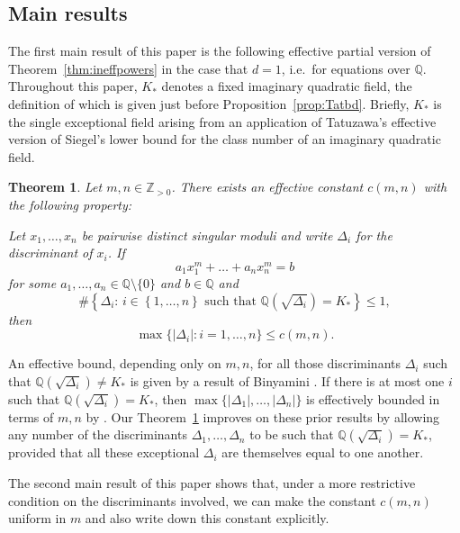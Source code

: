 \documentclass[11pt,a4paper, british]{amsart}
\newtheorem{thm}{Theorem}[section]
\theoremstyle{definition}
\theoremstyle{remark}
\numberwithin{equation}{section}
\newcommand{\Q}{\mathbb{Q}} %
\newcommand{\Z}{\mathbb{Z}} %
\begin{document}
 \subsection{Main results}
	
		The first main result of this paper is the following effective partial version of Theorem~\ref{thm:ineffpowers} in the case that $d=1$, i.e.~for equations over $\Q$. Throughout this paper, $K_*$ denotes a fixed imaginary quadratic field, the definition of which is given just before Proposition~\ref{prop:Tatbd}. Briefly, $K_*$ is the single exceptional field arising from an application of Tatuzawa's effective version \cite{Tatuzawa51} of Siegel's lower bound \cite{Siegel35} for the class number of an imaginary quadratic field. 
		
		\begin{thm}\label{thm:effpowers}
			Let $m, n \in \Z_{>0}$. There exists an effective constant $c(m, n)$ with the following property: 
			
			Let $x_1, \ldots, x_n$ be pairwise distinct singular moduli and write $\Delta_i$ for the discriminant of $x_i$. If
			\[ a_1 x_1^m + \ldots + a_n x_n^m = b\]
			for some $a_1, \ldots, a_n \in \Q \setminus \{0\}$ and $b \in \Q$ and
			\[  \# \left \{ \Delta_i :  \, i \in \left \{1, \ldots, n\right \} \mbox{ such that } \Q\left(\sqrt{\Delta_i}\right) = K_* \right \} \leq 1,\]
			then
			\[ \max \{ \lvert \Delta_i \rvert : i=1, \ldots, n\} \leq c(m, n).\]
		\end{thm}
	

	
	An effective bound, depending only on $m, n$, for all those discriminants $\Delta_i$ such that $\Q(\sqrt{\Delta_i}) \neq K_*$ is given by a result of Binyamini \cite[Theorem~1]{Binyamini19}. If there is at most one $i$ such that $\Q(\sqrt{\Delta_i}) = K_*$, then $\max \{ \lvert \Delta_1 \rvert, \ldots, \lvert \Delta_n \rvert\}$ is effectively bounded in terms of $m, n$ by \cite[Corollary 1]{Binyamini19}. Our Theorem~\ref{thm:effpowers} improves on these prior results by allowing any number of the discriminants $\Delta_1, \ldots, \Delta_n$ to be such that $\Q(\sqrt{\Delta_i}) = K_*$, provided that all these exceptional $\Delta_i$ are themselves equal to one another. 


The second main result of this paper shows that, under a more restrictive condition on the discriminants involved, we can make the constant $c(m, n)$ uniform in $m$ and also write down this constant explicitly.
	
\end{document}
